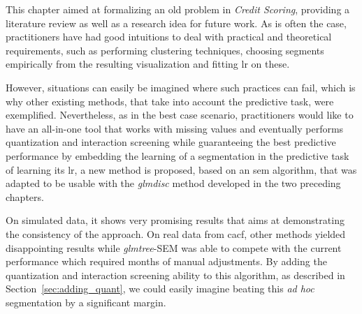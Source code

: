 \bigskip

This chapter aimed at formalizing an old problem in \textit{Credit Scoring}, providing a literature review as well as a research idea for future work. As is often the case, practitioners have had good intuitions to deal with practical and theoretical requirements, such as performing clustering techniques, choosing segments empirically from the resulting visualization and fitting \gls{lr} on these.

However, situations can easily be imagined where such practices can fail, which is why other existing methods, that take into account the predictive task, were exemplified. Nevertheless, as in the best case scenario, practitioners would like to have an all-in-one tool that works with missing values and eventually performs quantization and interaction screening while guaranteeing the best predictive performance by embedding the learning of a segmentation in the predictive task of learning its \gls{lr}, a new method is proposed, based on an \gls{sem} algorithm, that was adapted to be usable with the \textit{glmdisc} method developed in the two preceding chapters.

On simulated data, it shows very promising results that aims at demonstrating the consistency of the approach. On real data from \gls{cacf}, other methods yielded disappointing results while \textit{glmtree}-SEM was able to compete with the current performance which required months of manual adjustments. By adding the quantization and interaction screening ability to this algorithm, as described in Section~\ref{sec:adding_quant}, we could easily imagine beating this \textit{ad hoc} segmentation by a significant margin.

\printbibliography[heading=subbibliography, title=References of Chapter 5]

